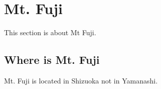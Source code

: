 \chapter{Mt. Fuji}\label{Chap2}
\minitoc

This section is about Mt Fuji.

\section{Where is Mt. Fuji}\label{sec:mtfuji}
Mt. Fuji is located in Shizuoka not in Yamanashi.

